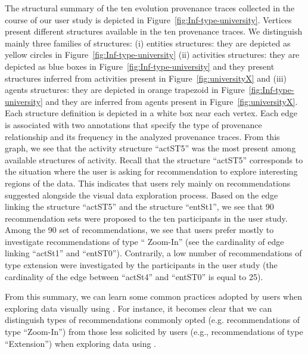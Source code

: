 \begin{example}\label{par:example2}
 The structural summary of the ten evolution provenance traces collected in the course of our user study is depicted in Figure~\ref{fig:Inf-type-university}. Vertices present different structures available in the ten provenance traces. 
 We distinguish mainly three families of structures: (i) entities structures: they are depicted as yellow circles in Figure~\ref{fig:Inf-type-university} (ii) activities structures: they are depicted as blue boxes in Figure~\ref{fig:Inf-type-university} and they present structures inferred from activities present in Figure~\ref{fig:universityX} and (iii) agents structures: they are depicted in orange trapezoid in Figure~\ref{fig:Inf-type-university} and they are inferred from agents present in Figure~\ref{fig:universityX}. 
 Each structure definition is depicted in a white box near each vertex. Each edge is associated with two annotations that specify the type of provenance relationship and its frequency in the analyzed provenance traces. 
 From this graph, we see that the activity structure ``actST5'' was the most present among available structures of activity. Recall that  the structure ``actST5'' corresponds to the situation where the user is asking for recommendation to explore interesting regions of the data.   This indicates that users rely mainly on recommendations suggested alongside the visual data exploration process.
 Based on the edge linking the structure  ``actST5'' and the structure ``entSt1'', we see that 90 recommendation sets were proposed to the ten participants in the user study.   Among the 90 set of recommendations, we see that users prefer mostly to investigate recommendations of type `` Zoom-In'' (see the cardinality of edge linking ``actSt1'' and ``entST0''). Contrarily, a low number of recommendations of type extension were investigated by the participants in the user study (the cardinality of the edge between ``actSt4'' and ``entST0'' is equal to 25).
 
From this summary, we can learn some common practices adopted by users when exploring data visually using \prototype{}.
For instance, it becomes clear that we can distinguish types of recommendations commonly opted (e.g. recommendations of type ``Zoom-In'') from those less solicited by users (e.g., recommendations of type ``Extension'') when exploring data using \prototype{}.
\end{example}





